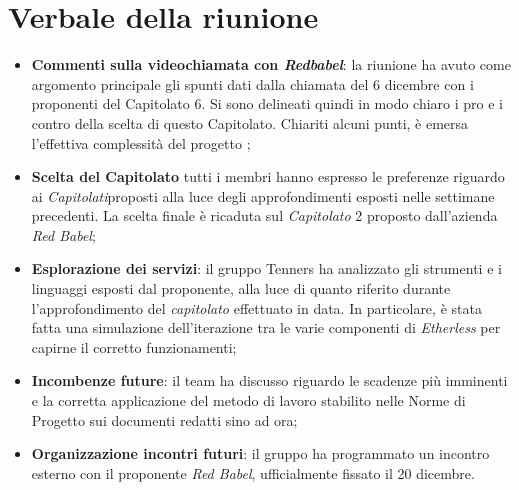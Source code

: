 \section{Verbale della riunione}
	\begin{itemize}
		\item \textbf{Commenti sulla videochiamata con \textit{Redbabel}}:
        la riunione ha avuto come argomento principale gli spunti dati dalla chiamata del 6 dicembre con i proponenti del Capitolato 6. Si sono delineati quindi in modo chiaro i pro e i contro della scelta di questo Capitolato. Chiariti alcuni punti, è emersa l'effettiva complessità del progetto ;
        \item \textbf{Scelta del Capitolato\glos} tutti i membri hanno espresso le preferenze riguardo ai \textit{Capitolati}\glo proposti alla luce degli approfondimenti esposti nelle settimane precedenti. La scelta finale è ricaduta sul \textit{Capitolato\glo} 2 proposto dall'azienda \textit{Red Babel};
		\item \textbf{Esplorazione dei servizi}:
		il gruppo Tenners ha analizzato gli strumenti e i linguaggi esposti dal proponente, alla luce di quanto riferito durante l'approfondimento del \textit{capitolato\glo} effettuato in data. In particolare, è stata fatta una simulazione dell'iterazione tra le varie componenti di \textit{Etherless} per capirne il corretto funzionamenti;
        \item \textbf{Incombenze future}: il team ha discusso riguardo le scadenze più imminenti e la corretta applicazione del metodo di lavoro stabilito nelle Norme di Progetto sui documenti redatti sino ad ora;
		\item \textbf{Organizzazione incontri futuri}: il gruppo ha programmato un incontro esterno con il proponente \textit{Red Babel}, ufficialmente fissato il 20 dicembre.
	\end{itemize}

